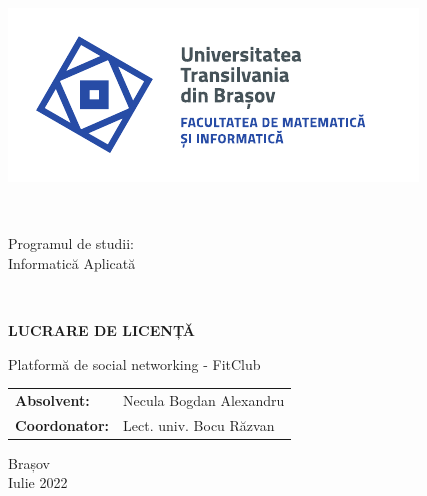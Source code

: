 \begin{titlepage}
	
	\vspace*{-3cm}
	\hspace{-2cm}
	
	\begin{minipage}{0.1\textwidth}\raggedleft
		\includegraphics[width=6.5\linewidth]{./images/Logo-UT-MI-SPOT-RO}
	\end{minipage}
	~
	\begin{minipage}{0.8\textwidth}\raggedleft
		Programul de studii:\\
		Informatică Aplicată
	\end{minipage}\\[1cm]
	
		\begin{center}
		\Huge
		
		\vspace{2cm}
		
		\textbf{LUCRARE DE LICENȚĂ}
		
		\vspace{1cm}
		
		\LARGE
		Platformă de social networking - FitClub
		
		\vfill
		
		\Large
		\begin{tabular}{ll}
			\textbf{Absolvent:}&Necula Bogdan Alexandru\\
			\textbf{Coordonator:}&Lect. univ. Bocu Răzvan\\
		\end{tabular}
		
		\vfill
		
		\Large
		Brașov\\
		Iulie 2022
		
	\end{center}
\end{titlepage}